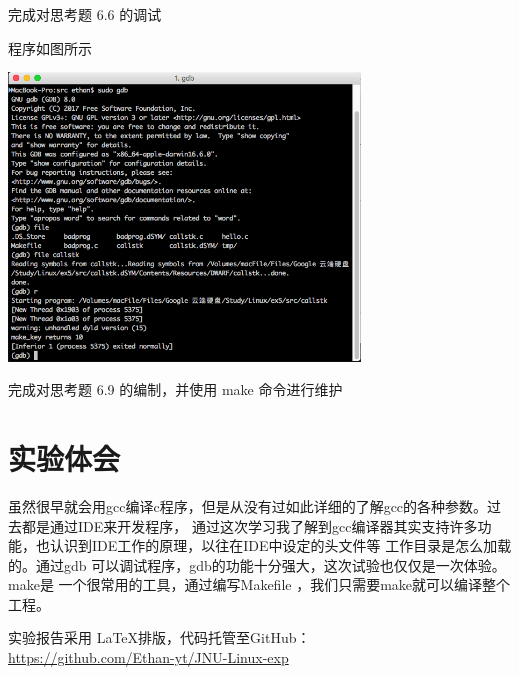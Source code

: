 \documentclass{JNUexp}
\begin{document}
\begin{problem}
    完成对思考题 6.6 的调试
\end{problem}

\begin{answer}
    程序如图所示
    
\end{answer}

\begin{image}
    \includegraphics[width=0.7\textwidth]{5}
\end{image}

\begin{problem}
    完成对思考题 6.9 的编制，并使用 make 命令进行维护
\end{problem}

\begin{answer}
    Makefile如图所示
    make},title=Makefile]{../src/Makefile}
\end{answer}

\newpage
\section{实验体会}
虽然很早就会用gcc编译c程序，但是从没有过如此详细的了解gcc的各种参数。过去都是通过IDE来开发程序，
通过这次学习我了解到gcc编译器其实支持许多功能，也认识到IDE工作的原理，以往在IDE中设定的头文件等
工作目录是怎么加载的。通过gdb 可以调试程序，gdb的功能十分强大，这次试验也仅仅是一次体验。make是
一个很常用的工具，通过编写Makefile ，我们只需要make就可以编译整个工程。

\vfill

实验报告采用 \LaTeX 排版，代码托管至GitHub：\\
\url{https://github.com/Ethan-yt/JNU-Linux-exp}
\end{document}
